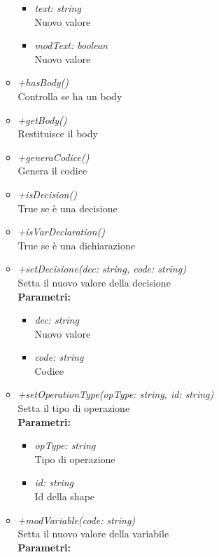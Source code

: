 \begin{itemize}
\begin{itemize}
\begin{itemize}
    			\item \emph{text: string}\\
    			Nuovo valore
    			\item \emph{modText: boolean}\\
    			Nuovo valore
    		\end{itemize}
    		\item \emph{+hasBody()}\\
    		Controlla se ha un body
    		\item \emph{+getBody()}\\
    		Restituisce il body
    		\item \emph{+generaCodice()}\\
    		Genera il codice
    		\item \emph{+isDecision()}\\
    		True se è una decisione
    		\item \emph{+isVarDeclaration()}\\
    		True se è una dichiarazione
    		\item \emph{+setDecisione(dec: string, code: string)}\\
    		Setta il nuovo valore della decisione\\
    		\textbf{Parametri:}
    		\begin{itemize}
    			\item \emph{dec: string}\\
    			Nuovo valore
    			\item \emph{code: string}\\
    			Codice
    		\end{itemize}
    		\item \emph{+setOperationType(opType: string, id: string)}\\
    		Setta il tipo di operazione\\
    		\textbf{Parametri:}
    		\begin{itemize}
    			\item \emph{opType: string}\\
    			Tipo di operazione
    			\item \emph{id: string}\\
    			Id della shape
    		\end{itemize}
    		\item \emph{+modVariable(code: string)}\\
    		Setta il nuovo valore della variabile\\
    		\textbf{Parametri:}
    		\begin{itemize}

\end{itemize}
\end{itemize}
\end{itemize}

